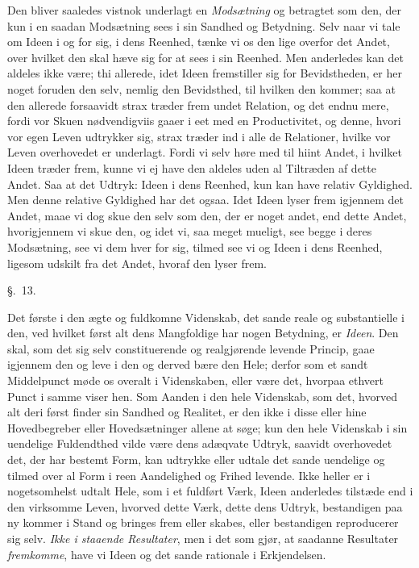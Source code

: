 \documentclass[12pt,a4paper]{book}
\newcommand{\apage}[1]{\marginnote{\footnotesize\textit{[#1]}}}
\begin{document}
Den bliver saaledes vistnok underlagt en \emph{Modsætning} og betragtet som den,
der kun i en saadan Modsætning sees i sin Sandhed og  \apage{119} Betydning. Selv naar vi tale
om Ideen i og for sig, i dens Reenhed, tænke vi os den lige overfor det Andet,
over hvilket den skal hæve sig for at sees i sin Reenhed. Men anderledes kan det
aldeles ikke være; thi allerede, idet Ideen fremstiller sig for Bevidstheden, er
her noget foruden den selv, nemlig den Bevidsthed, til hvilken den kommer; saa at
den allerede forsaavidt strax træder frem undet Relation, og det endnu mere, fordi
vor Skuen nødvendigviis gaaer i eet med en Productivitet, og denne, hvori vor egen
Leven udtrykker sig, strax træder ind i alle de Relationer, hvilke vor Leven
overhovedet er underlagt. Fordi vi selv høre med til hiint Andet, i hvilket Ideen
træder frem, kunne vi ej have den aldeles uden al Tiltræden af dette Andet. Saa
at det Udtryk: Ideen i dens Reenhed, kun kan have relativ Gyldighed. Men denne
relative Gyldighed har det ogsaa. Idet Ideen lyser frem igjennem det Andet, maae
vi dog skue den selv som den, der er noget andet, end dette Andet, hvorigjennem vi
skue den, og idet vi, saa meget mueligt, see begge i deres Modsætning, see vi dem
hver for sig, tilmed see vi og Ideen i dens Reenhed, ligesom udskilt fra det
Andet, hvoraf den lyser frem.

\begin{center}\large\S.~13.\end{center} \apage{120} 

Det første i den ægte og fuldkomne Videnskab, det sande reale og substantielle i
den, ved hvilket først alt dens Mangfoldige har nogen Betydning, er \emph{Ideen}.
Den skal, som det sig selv constituerende og realgjørende levende Princip, gaae
igjennem den og leve i den og derved bære den Hele; derfor som et sandt
Middelpunct møde os overalt i Videnskaben, eller være det, hvorpaa ethvert Punct i
samme viser hen. Som Aanden i den hele Videnskab, som det, hvorved alt deri først
finder sin Sandhed og Realitet, er den ikke i disse eller hine Hovedbegreber eller
Hovedsætninger allene at søge; kun den hele Videnskab i sin uendelige Fuldendthed
vilde være dens adæqvate Udtryk, saavidt overhovedet det, der har bestemt Form,
kan udtrykke eller udtale det sande uendelige og tilmed over al Form i reen
Aandelighed og Frihed levende. Ikke heller er i nogetsomhelst udtalt Hele, som i
et fuldført Værk, Ideen anderledes tilstæde end i den virksomme Leven, hvorved
dette Værk, dette dens Udtryk, bestandigen paa ny kommer i Stand og bringes frem
eller skabes, eller bestandigen reproducerer sig selv. \emph{Ikke i staaende
Resultater}, men i det som gjør, at saadanne Resultater \emph{fremkomme}, have vi
Ideen og det sande rationale i Erkjendelsen. \apage{121} 
\end{document}
